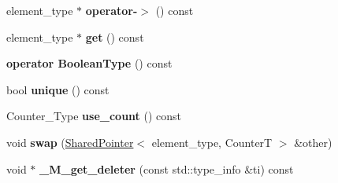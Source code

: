 \begin{DoxyCompactItemize}
element\+\_\+type $\ast$ {\bfseries operator-\/$>$} () const
\item 
\mbox{\label{classcugar_1_1_shared_pointer_ac7020fab95a8607a685bbcf0d52d4948}} 
element\+\_\+type $\ast$ {\bfseries get} () const
\item 
\mbox{\label{classcugar_1_1_shared_pointer_a7231377cbf65e31eda14f801a011cadc}} 
{\bfseries operator Boolean\+Type} () const
\item 
\mbox{\label{classcugar_1_1_shared_pointer_a5cee5059b6d44e7e6f812db3569a5eee}} 
bool {\bfseries unique} () const
\item 
\mbox{\label{classcugar_1_1_shared_pointer_ae2a4648b8571dd9049c06ada69613c70}} 
Counter\+\_\+\+Type {\bfseries use\+\_\+count} () const
\item 
\mbox{\label{classcugar_1_1_shared_pointer_a4f73d65657c59c39935c76ee532d33b6}} 
void {\bfseries swap} (\hyperlink{classcugar_1_1_shared_pointer}{Shared\+Pointer}$<$ element\+\_\+type, CounterT $>$ \&other)
\item 
\mbox{\label{classcugar_1_1_shared_pointer_ae6570a56bfbba28fbf573dc12ec57594}} 
void $\ast$ {\bfseries \+\_\+\+M\+\_\+get\+\_\+deleter} (const std\+::type\+\_\+info \&ti) const
\end{DoxyCompactItemize}
